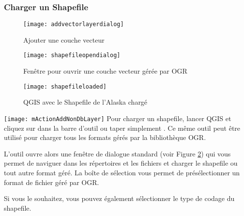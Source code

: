 \subsubsection{Charger un Shapefile}\label{sec:load_shapefile}

\begin{figure}[ht]
   \begin{center}
   \caption{Ajouter une couche vecteur \nixcaption}\label{fig:addvectorlayer}\smallskip
   \texttt{[image: addvectorlayerdialog]}
\end{center} 
\end{figure}

\begin{figure}[ht]
  \begin{center}
  \caption{Fenêtre pour ouvrir une couche vecteur gérée par OGR \nixcaption}\label{fig:openshapefile}\smallskip
  \texttt{[image: shapefileopendialog]}
\end{center}
\end{figure}

\begin{figure}[ht]
  \begin{center}
  \caption{QGIS avec le Shapefile de l'Alaska chargé \nixcaption}\label{fig:loadedshapefile}\smallskip
  \texttt{[image: shapefileloaded]}
\end{center}
\end{figure}

\texttt{[image: mActionAddNonDbLayer]} Pour charger un shapefile, lancer QGIS et cliquez sur  dans la barre d'outil ou taper simplement . Ce même outil peut être utilisé pour charger tous les formats gérés par la bibliothèque OGR.

L'outil ouvre alors une fenêtre de dialogue standard (voir Figure \ref{fig:openshapefile}) qui vous permet de naviguer dans les répertoires et les fichiers et charger le shapefile ou tout autre format géré.
La boîte de sélection  vous permet de présélectionner un format de fichier géré par OGR.

Si vous le souhaitez, vous pouvez également sélectionner le type de codage du shapefile.

